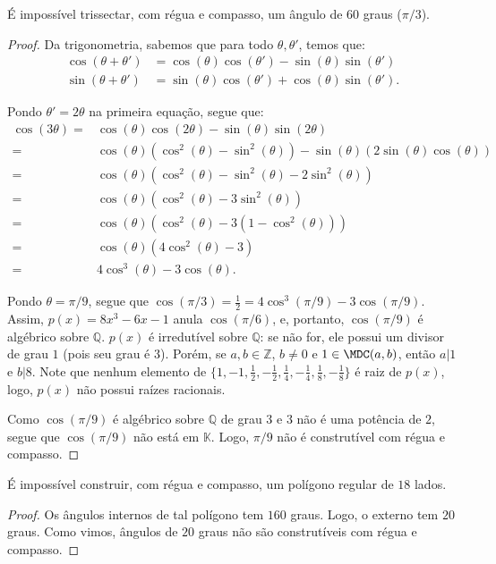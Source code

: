 \begin{prop}
    É impossível trissectar, com régua e compasso, um ângulo de $60$ graus ($\pi/3$).
\end{prop}
\begin{proof}
    Da trigonometria, sabemos que para todo $\theta, \theta'$, temos que:
    \begin{align*}
        \cos(\theta+\theta')&=\cos(\theta)\cos(\theta')-\sin(\theta)\sin(\theta')\\
        \sin(\theta+\theta')&=\sin(\theta)\cos(\theta')+\cos(\theta)\sin(\theta').
    \end{align*}

    Pondo $\theta'=2\theta$ na primeira equação, segue que:
    \begin{align*}
        \cos(3\theta)=&\cos(\theta)\cos(2\theta)-\sin(\theta)\sin(2\theta) \\
        =&\cos(\theta)(\cos^2(\theta)-\sin^2(\theta))-\sin(\theta)(2\sin(\theta)\cos(\theta)) \\
        =&\cos(\theta)(\cos^2(\theta)-\sin^2(\theta)-2\sin^2(\theta)) \\
        =&\cos(\theta)(\cos^2(\theta)-3\sin^2(\theta)) \\
        =&\cos(\theta)(\cos^2(\theta)-3(1-\cos^2(\theta))) \\
        =&\cos(\theta)(4\cos^2(\theta)-3) \\
        =&4\cos^3(\theta)-3\cos(\theta).
    \end{align*}    

    Pondo $\theta=\pi/9$, segue que $\cos(\pi/3)=\frac{1}{2}=4\cos^3(\pi/9)-3\cos(\pi/9)$. Assim, $p(x)=8x^3-6x-1$ anula $\cos(\pi/6)$, e, portanto, $\cos(\pi/9)$ é algébrico sobre $\mathbb Q$.
    $p(x)$ é irredutível sobre $\mathbb Q$: se não for, ele possui um divisor de grau $1$ (pois seu grau é $3$). Porém, se $a, b \in \mathbb Z$, $b\neq 0$ e $1\in \MDC(a, b)$, então $a|1$ e $b|8$. Note que nenhum elemento de $\{1, -1, \frac{1}{2}, -\frac{1}{2}, \frac{1}{4}, -\frac{1}{4}, \frac{1}{8}, -\frac{1}{8}\}$ é raiz de $p(x)$, logo, $p(x)$ não possui raízes racionais.

    Como $\cos(\pi/9)$ é algébrico sobre $\mathbb Q$ de grau $3$ e $3$ não é uma potência de $2$, segue que $\cos(\pi/9)$ não está em $\mathbb K$. Logo, $\pi/9$ não é construtível com régua e compasso.
\end{proof}
\begin{prop}
    É impossível construir, com régua e compasso, um polígono regular de $18$ lados.
\end{prop}
\begin{proof}
    Os ângulos internos de tal polígono tem $160$ graus. Logo, o externo tem $20$ graus. Como vimos, ângulos de $20$ graus não são construtíveis com régua e compasso.
\end{proof}

